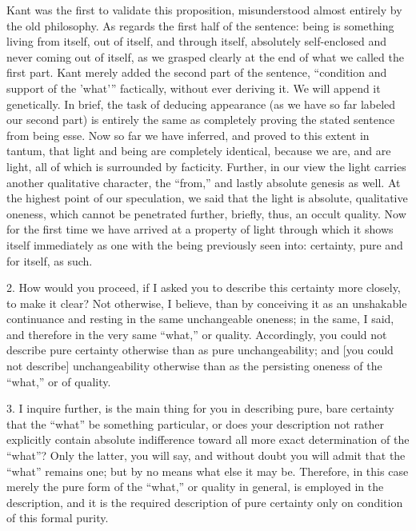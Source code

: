 Kant was the first to validate this proposition,
misunderstood almost entirely by the old philosophy.
As regards the first half of the sentence:
being is something living
from itself, out of itself, and through itself,
absolutely self-enclosed and never coming out of itself,
as we grasped clearly at the end of what we called the first part.
Kant merely added the second part of the sentence,
“condition and support of the 'what'”
factically, without ever deriving it.
We will append it genetically.
In brief, the task of deducing appearance
(as we have so far labeled our second part)
is entirely the same as completely proving the
stated sentence from being {esse}.
Now so far we have inferred,
and proved to this extent {in tantum},
that light and being are completely identical,
because we are, and are light,
all of which is surrounded by facticity.
Further, in our view the light carries
another qualitative character, the “from,”
and lastly absolute genesis as well.
At the highest point of our speculation,
we said that the light is absolute, qualitative oneness,
which cannot be penetrated further,
briefly, thus, an occult quality.
Now for the first time we have arrived
at a property of light through which it shows itself
immediately as one with the being previously seen into:
certainty, pure and for itself, as such.

2. How would you proceed, if I asked you
to describe this certainty more closely, to make it clear?
Not otherwise, I believe, than by conceiving it
as an unshakable continuance and resting
in the same unchangeable oneness;
in the same, I said, and therefore
in the very same “what,” or quality.
Accordingly, you could not describe pure certainty otherwise
than as pure unchangeability;
and [you could not describe] unchangeability otherwise
than as the persisting oneness of the “what,” or of quality.

3. I inquire further, is the main thing for you
in describing pure, bare certainty
that the “what” be something particular,
or does your description not rather explicitly contain
absolute indifference toward all more exact determination of the “what”?
Only the latter, you will say, and without doubt
you will admit that the “what” remains one;
but by no means what else it may be.
Therefore, in this case merely the pure form of the “what,”
or quality in general, is employed in the description,
and it is the required description of pure certainty
only on condition of this formal purity.

